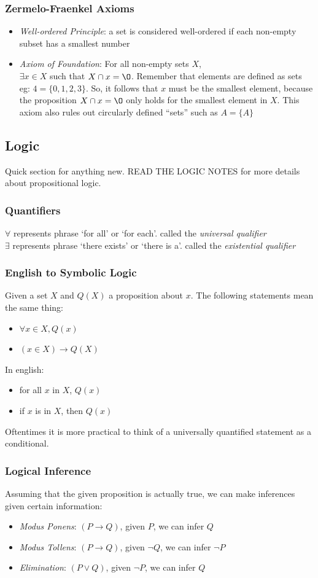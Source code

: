 \documentclass[a4paper,11pt]{article}
\begin{document}
\subsubsection{Zermelo-Fraenkel Axioms}
\begin{itemize}
 \item \textit{Well-ordered Principle}: a set is considered well-ordered if each non-empty subset has a smallest number
 \item \textit{Axiom of Foundation}: For all non-empty sets $X$,\\
 $\exists x \in X$ such that $X \cap x = \O$. Remember that elements are defined as sets eg: $4=\{0,1,2,3\}$. So, it follows that $x$ must be the smallest element, because the proposition $X \cap x=\O$ only holds for the smallest element in $X$. This axiom also rules out circularly defined ``sets'' such as $A=\{A\}$
\end{itemize}
\subsection{Logic}
Quick section for anything new. READ THE LOGIC NOTES for more details about propositional logic.
\subsubsection{Quantifiers}
$\forall$ represents phrase `for all' or `for each'. called the \textit{universal qualifier}\\
$\exists$ represents phrase `there exists' or `there is a'. called the \textit{existential qualifier}
\subsubsection{English to Symbolic Logic}
Given a set $X$ and $Q(X)$ a proposition about $x$. The following statements mean the same thing:
\begin{itemize}
 \item $\forall x \in X, Q(x)$
 \item $(x \in X) \rightarrow Q(X)$
\end{itemize}
In english:
\begin{itemize}
 \item for all $x$ in $X$, $Q(x)$
 \item if $x$ is in $X$, then $Q(x)$
\end{itemize}
Oftentimes it is more practical to think of a universally quantified statement as a conditional.
\subsubsection{Logical Inference}
Assuming that the given proposition is actually true, we can make inferences given certain information:
\begin{itemize}
 \item \textit{Modus Ponens}: $(P \rightarrow Q)$, given $P$, we can infer $Q$
 \item \textit{Modus Tollens}: $(P \rightarrow Q)$, given $\neg Q$, we can infer $\neg P$
 \item \textit{Elimination}: $(P \vee Q)$, given $\neg P$, we can infer $Q$
\end{itemize}
\end{document}
